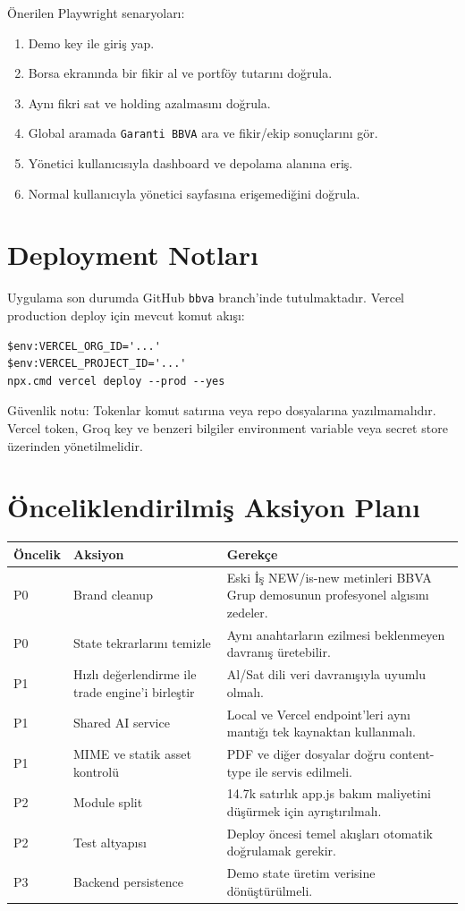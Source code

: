 \documentclass[11pt,a4paper]{article}
\newcommand{\code}[1]{\texttt{#1}}
\begin{document}
Önerilen Playwright senaryoları:

\begin{enumerate}
  \item Demo key ile giriş yap.
  \item Borsa ekranında bir fikir al ve portföy tutarını doğrula.
  \item Aynı fikri sat ve holding azalmasını doğrula.
  \item Global aramada \code{Garanti BBVA} ara ve fikir/ekip sonuçlarını gör.
  \item Yönetici kullanıcısıyla dashboard ve depolama alanına eriş.
  \item Normal kullanıcıyla yönetici sayfasına erişemediğini doğrula.
\end{enumerate}

\section{Deployment Notları}

Uygulama son durumda GitHub \code{bbva} branch'inde tutulmaktadır. Vercel production deploy için mevcut komut akışı:

\begin{lstlisting}
$env:VERCEL_ORG_ID='...'
$env:VERCEL_PROJECT_ID='...'
npx.cmd vercel deploy --prod --yes
\end{lstlisting}

Güvenlik notu: Tokenlar komut satırına veya repo dosyalarına yazılmamalıdır. Vercel token, Groq key ve benzeri bilgiler environment variable veya secret store üzerinden yönetilmelidir.

\section{Önceliklendirilmiş Aksiyon Planı}

\begin{longtable}{p{}p{}p{}}
\toprule
\textbf{Öncelik} & \textbf{Aksiyon} & \textbf{Gerekçe}\\
\midrule
P0 & Brand cleanup & Eski İş NEW/is-new metinleri BBVA Grup demosunun profesyonel algısını zedeler.\\
P0 & State tekrarlarını temizle & Aynı anahtarların ezilmesi beklenmeyen davranış üretebilir.\\
P1 & Hızlı değerlendirme ile trade engine'i birleştir & Al/Sat dili veri davranışıyla uyumlu olmalı.\\
P1 & Shared AI service & Local ve Vercel endpoint'leri aynı mantığı tek kaynaktan kullanmalı.\\
P1 & MIME ve statik asset kontrolü & PDF ve diğer dosyalar doğru content-type ile servis edilmeli.\\
P2 & Module split & 14.7k satırlık app.js bakım maliyetini düşürmek için ayrıştırılmalı.\\
P2 & Test altyapısı & Deploy öncesi temel akışları otomatik doğrulamak gerekir.\\
P3 & Backend persistence & Demo state üretim verisine dönüştürülmeli.\\
\bottomrule
\end{longtable}
\end{document}
